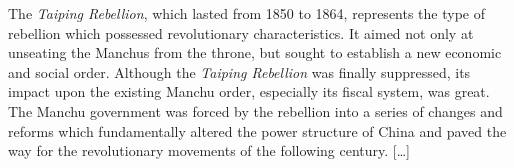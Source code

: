 \begin{fancyquote}
	The \textit{Taiping Rebellion}, which lasted from 1850 to 1864, represents the type of rebellion which possessed revolutionary characteristics. It aimed not only at unseating the Manchus from the throne, but sought to establish a new economic and social order. Although the \textit{Taiping Rebellion} was finally suppressed, its impact upon the existing Manchu order, especially its fiscal system, was great. The Manchu government was forced by the rebellion into a series of changes and reforms which fundamentally altered the power structure of China and paved the way for the revolutionary movements of the following century. [\ldots]
	\begin{flushright}
		\autocite{Wu:1950}
	\end{flushright}
\end{fancyquote}
